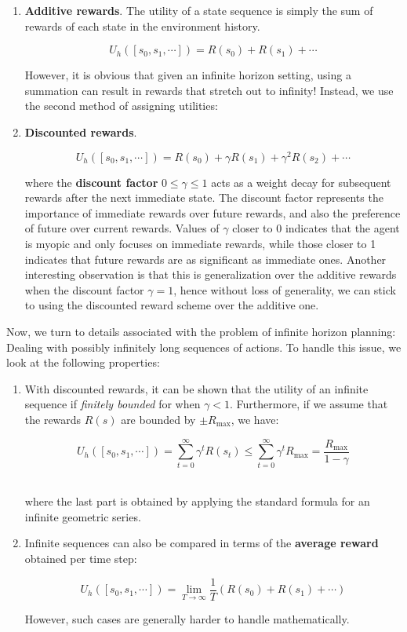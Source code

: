 \documentclass[11pt]{article}
\begin{document}
\begin{enumerate}
    \item \textbf{Additive rewards}. The utility of a state sequence is simply the sum of rewards of each state in the environment history.
    
    $$
    U_h([s_0, s_1, \cdots]) = R(s_0) + R(s_1) + \cdots
    $$
    
    However, it is obvious that given an infinite horizon setting, using a summation can result in rewards that stretch out to infinity! Instead, we use the second method of assigning utilities:
    
    \item \textbf{Discounted rewards}.
    
    $$
    U_h([s_0, s_1, \cdots]) = R(s_0) + \gamma R(s_1) + \gamma^2 R(s_2)+ \cdots
    $$
    
    where the \textbf{discount factor} $0 \leq \gamma \leq 1$ acts as a weight decay for subsequent rewards after the next immediate state. The discount factor represents the importance of immediate rewards over future rewards, and also the preference of future over current rewards. Values of $\gamma$ closer to 0 indicates that the agent is myopic and only focuses on immediate rewards, while those closer to 1 indicates that future rewards are as significant as immediate ones. Another interesting observation is that this is generalization over the additive rewards when the discount factor $\gamma = 1$, hence without loss of generality, we can stick to using the discounted reward scheme over the additive one.
\end{enumerate}

Now, we turn to details associated with the problem of infinite horizon planning: Dealing with possibly infinitely long sequences of actions. To handle this issue, we look at the following properties:

\begin{enumerate}
    \item With discounted rewards, it can be shown that the utility of an infinite sequence if \textit{finitely bounded} for when $\gamma < 1$. Furthermore, if we assume that the rewards $R(s)$ are bounded by $\pm R_{\max}$, we have:
    
    $$
    U_h([s_0, s_1, \cdots]) = \sum^{\infty}_{t=0} \gamma^t R(s_t) \leq \sum^{\infty}_{t=0} \gamma^t R_{\max} = \frac{R_{\max}}{1-\gamma}
    $$\
    
    where the last part is obtained by applying the standard formula for an infinite geometric series.
    
    \item Infinite sequences can also be compared in terms of the \textbf{average reward} obtained per time step:
    
    $$
    U_h([s_0, s_1, \cdots]) = \lim_{T \rightarrow \infty} \frac{1}{T}(R(s_0) + R(s_1) + \cdots)
    $$
    
    However, such cases are generally harder to handle mathematically.
    
\end{enumerate}
\end{document}
